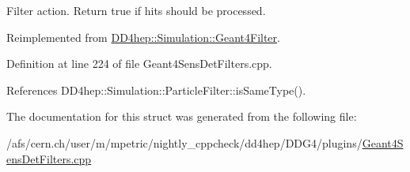 Filter action. Return true if hits should be processed. 



Reimplemented from \hyperlink{class_d_d4hep_1_1_simulation_1_1_geant4_filter_a373f84ddcbefe180daa058050b6cf753}{D\+D4hep\+::\+Simulation\+::\+Geant4\+Filter}.



Definition at line 224 of file Geant4\+Sens\+Det\+Filters.\+cpp.



References D\+D4hep\+::\+Simulation\+::\+Particle\+Filter\+::is\+Same\+Type().



The documentation for this struct was generated from the following file\+:\begin{DoxyCompactItemize}
\item 
/afs/cern.\+ch/user/m/mpetric/nightly\+\_\+cppcheck/dd4hep/\+D\+D\+G4/plugins/\hyperlink{_geant4_sens_det_filters_8cpp}{Geant4\+Sens\+Det\+Filters.\+cpp}\end{DoxyCompactItemize}
